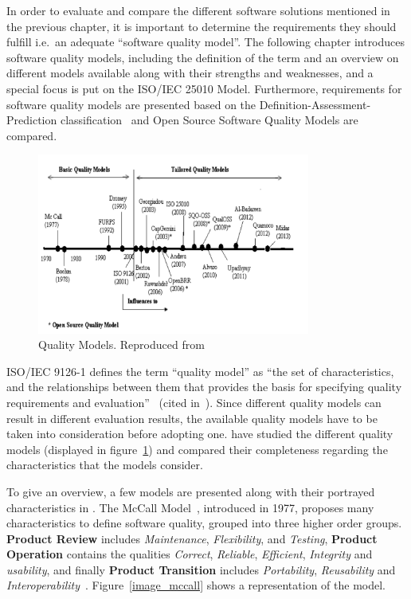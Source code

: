 In order to evaluate and compare the different software solutions
mentioned in the previous chapter, it is important to determine the
requirements they should fulfill i.e.~an adequate ``software quality
model''. The following chapter introduces software quality
models, including the definition of the term and an overview on
different models available along with their strengths and weaknesses, and a
special focus is put on the ISO/IEC 25010 Model. Furthermore, requirements
for software quality models are presented based on the
Definition-Assessment-Prediction classification~\cite{dap_model} and Open Source
Software Quality Models are compared.

\begin{figure}[h!]
    \centering
    \includegraphics[width=0.8\textwidth]{images/Untitled_12.png}
    \caption{Quality Models. Reproduced from~\cite{quality_models}}
    \label{image_history_of_quality_model}
\end{figure}

ISO/IEC 9126-1 defines the term ``quality model'' as ``the
set of characteristics, and the relationships between them that provides
the basis for specifying quality requirements and
evaluation''~\cite{iso9126} (cited in~\cite{quality_models}). Since different quality models can result in different evaluation
results, the available quality models have to be taken into
consideration before adopting one. \cite{quality_models}
have studied the different quality models (displayed in figure~\ref{image_history_of_quality_model}) and compared
their completeness regarding the characteristics that the models
consider.



To give an overview, a few models are presented along with their
portrayed characteristics in
\cite{quality_models}.
The McCall Model~\cite{mccall}, introduced in 1977, proposes many characteristics to
define software quality, grouped into three higher order groups.
\textbf{Product Review} includes
\textit{Maintenance},
\textit{Flexibility}, and
\textit{Testing}, \textbf{Product Operation}
contains the qualities
\textit{Correct},
\textit{Reliable},
\textit{Efficient},
\textit{Integrity} and
\textit{usability}, and finally \textbf{Product Transition} includes
\textit{Portability},
\textit{Reusability} and
\textit{Interoperability}~\cite{quality_models}. Figure~\ref{image_mccall} shows a representation of the
model.

